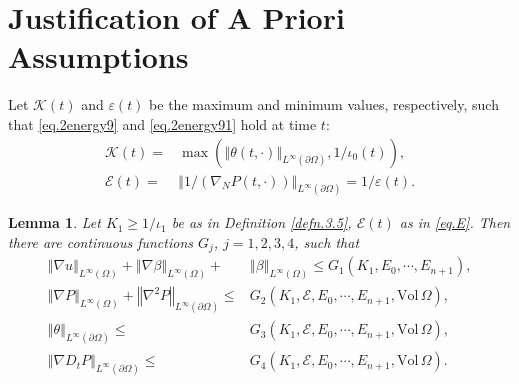 \documentclass[12pt,reqno]{amsart}
\numberwithin{equation}{section}
\newtheorem{lemma}[theorem]{Lemma}
\theoremstyle{definition}
\theoremstyle{remark}
\begin{document}
\section{Justification of A Priori Assumptions}

Let  ${\mathcal{K}}(t)$ and ${\varepsilon}(t)$ be the maximum and minimum values, respectively, such that \eqref{eq.2energy9} and \eqref{eq.2energy91} hold at time $t$:
\begin{align}
  {\mathcal{K}}(t)=&\max\left({\left\Vert{\theta(t,\cdot)}\right\Vert}_{L^\infty({\partial}\Omega)}, 1/\iota_0(t)\right),\label{eq.K}\\
  {\mathcal{E}}(t)=&{\left\Vert{1/({\nabla}_N {P }(t,\cdot))}\right\Vert}_{L^\infty({\partial}\Omega)}=1/{\varepsilon}(t). \label{eq.E}
\end{align}

\begin{lemma}\label{lem.7.6}
  Let $K_1{\geqslant} 1/\iota_1$ be as in Definition \ref{defn.3.5}, ${\mathcal{E}}(t)$ as in \eqref{eq.E}. Then there are continuous functions $G_j$, $j=1,2,3,4$, such that
  \begin{align}
    {\left\Vert{{\nabla} u}\right\Vert}_{L^\infty(\Omega)}+{\left\Vert{{\nabla} \beta}\right\Vert}_{L^\infty(\Omega)}+&{\left\Vert{ \beta}\right\Vert}_{L^\infty(\Omega)}{\leqslant} G_1(K_1,E_0,\cdots, E_{n+1}),\label{eq.e.1}\\
    {\left\Vert{{\nabla} {P }}\right\Vert}_{L^\infty(\Omega)}+{\left\Vert{{\nabla}^2{P }}\right\Vert}_{L^\infty({\partial}\Omega)}{\leqslant} &G_2(K_1,{\mathcal{E}},E_0,\cdots, E_{n+1},{\mathrm{Vol}\,}\Omega),\label{eq.e.2}\\
    {\left\Vert{\theta}\right\Vert}_{L^\infty({\partial}\Omega)}{\leqslant} &G_3(K_1,{\mathcal{E}},E_0,\cdots, E_{n+1},{\mathrm{Vol}\,}\Omega),\label{eq.e.3}\\
    {\left\Vert{{\nabla} D_t{P }}\right\Vert}_{L^\infty({\partial}\Omega)}{\leqslant} &G_4(K_1,{\mathcal{E}},E_0,\cdots, E_{n+1},{\mathrm{Vol}\,}\Omega).\label{eq.e.4}
  \end{align}
\end{lemma}
\end{document}
